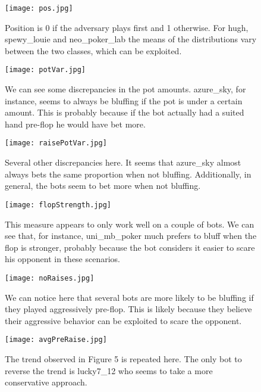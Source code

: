 \documentclass[letterpaper]{article}
\begin{document}
\onecolumn
\begin{figure}[H]
    \centering
    \texttt{[image: pos.jpg]}
    \caption{Position is 0 if the adversary plays first and 1 otherwise. For hugh, spewy\_louie  and neo\_poker\_lab the means of the distributions vary between the two classes, which can be exploited. }
    \label{fig:pos}
\end{figure}
\begin{figure}[H]
    \centering
    \texttt{[image: potVar.jpg]}
    \caption{We can see some discrepancies in the pot amounts. azure\_sky, for instance, seems to always be bluffing if the pot is under a certain amount. This is probably because if the bot actually had a suited hand pre-flop he would have bet more.}
\end{figure}
\begin{figure}[H]
    \centering
    \texttt{[image: raisePotVar.jpg]}
    \caption{Several other discrepancies here. It seems that azure\_sky almost always bets the same proportion when not bluffing. Additionally, in general, the bots seem to bet more when not bluffing.}
\end{figure}
\clearpage
\begin{figure}[H]
    \centering
    \texttt{[image: flopStrength.jpg]}
    \caption{This measure appears to only work well on a couple of bots. We can see that, for instance, uni\_mb\_poker much prefers to bluff when the flop is stronger, probably because the bot considers it easier to scare his opponent in these scenarios.}
\end{figure}

\begin{figure}[H]
    \centering
    \texttt{[image: noRaises.jpg]}
    \caption{We can notice here that several bots are more likely to be bluffing if they played aggressively pre-flop. This is likely because they believe their aggressive behavior can be exploited to scare the opponent.}
\end{figure}

\begin{figure}[H]
    \centering
    \texttt{[image: avgPreRaise.jpg]}
    \caption{The trend observed in Figure 5 is repeated here. The only bot to reverse the trend is lucky7\_12 who seems to take a more conservative approach.}
\end{figure}
\end{document}

